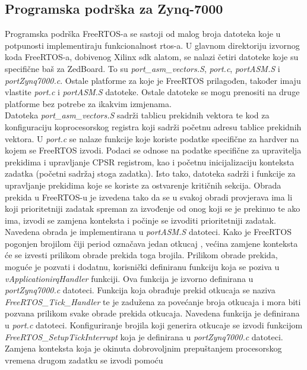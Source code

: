 \documentclass[times, utf8, diplomski, numeric]{fer}
\begin{document}
\subsection{Programska podrška za Zynq-7000}
Programska podrška FreeRTOS-a se sastoji od malog broja datoteka koje u potpunosti implementiraju funkcionalnost \gls{rtos}-a.
U glavnom direktoriju izvornog koda FreeRTOS-a, dobivenog Xilinx \gls{sdk} alatom, se nalazi četiri datoteke koje su specifične
baš za ZedBoard. To su \textit{port\_asm\_vectors.S}, \textit{port.c}, \textit{portASM.S} i \textit{portZynq7000.c}. Ostale
platforme za koje je FreeRTOS prilagođen, također imaju vlastite \textit{port.c} i \textit{portASM.S} datoteke. Ostale
datoteke se mogu prenositi na druge platforme bez potrebe za ikakvim izmjenama.\\
Datoteka \textit{port\_asm\_vectors.S} sadrži tablicu prekidnih vektora te kod za konfiguraciju koprocesorskog registra koji
sadrži početnu adresu tablice prekidnih vektora. U \textit{port.c} se nalaze funkcije koje koriste podatke specifične za
hardver na kojem se FreeRTOS izvodi. Podaci se odnose na podatke specifične za upravitelja prekidima i upravljanje CPSR
registrom, kao i početnu inicijalizaciju konteksta zadatka (početni sadržaj stoga zadatka). Isto tako, datoteka sadrži i
funkcije za upravljanje prekidima koje se koriste za ostvarenje kritičnih sekcija. Obrada prekida u FreeRTOS-u je izvedena
tako da se u svakoj obradi provjerava ima li koji prioritetniji zadatak spreman za izvođenje od onog koji se je prekinuo te
ako ima, izvodi se zamjena konteksta i počinje se izvoditi prioritetniji zadatak. Navedena obrada je implementirana u
\textit{portASM.S} datoteci. Kako je FreeRTOS pogonjen brojilom čiji period označava jedan otkucaj , većina
zamjene konteksta će se izvesti prilikom obrade prekida toga brojila. Prilikom obrade prekida, moguće je pozvati i dodatnu,
korisnički definiranu funkciju koja se poziva u \textit{vApplication\gls{irq}Handler} funkciji. Ova funkcija je izvorno definirana
u \textit{portZynq7000.c} datoteci. Funkcija koja obrađuje prekid otkucaja se naziva \textit{FreeRTOS\_Tick\_Handler} te
je zadužena za povećanje broja otkucaja i mora biti pozvana prilikom svake obrade prekida otkucaja. Navedena funkcija je
definirana u \textit{port.c} datoteci. Konfiguriranje brojila koji generira otkucaje se izvodi funkcijom
\textit{FreeRTOS\_SetupTickInterrupt} koja je definirana u \textit{portZynq7000.c} datoteci.\\
Zamjena konteksta koja je okinuta dobrovoljnim prepuštanjem procesorskog vremena drugom zadatku se izvodi pomoću
\end{document}
